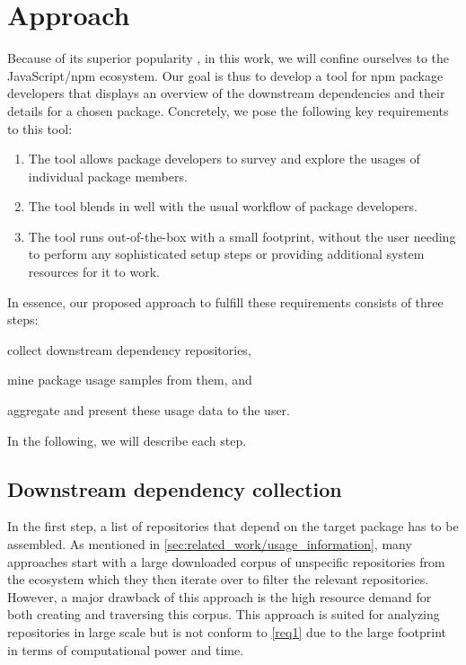 \section{Approach}
\label{sec:approach}

Because of its superior popularity , in this work, we will confine ourselves to the JavaScript/npm ecosystem.
Our goal is thus to develop a tool for npm package developers that displays an overview of the downstream dependencies and their details for a chosen package.
Concretely, we pose the following key requirements to this tool:

\begin{enumerate}[label=R\arabic*]
	\item \label{req1} The tool allows package developers to survey and explore the usages of individual package members.
	\item The tool blends in well with the usual workflow of package developers.
	\item \label{req3} The tool runs out-of-the-box with a small footprint, without the user needing to perform any sophisticated setup steps or providing additional system resources for it to work.
\end{enumerate}

In essence, our proposed approach to fulfill these requirements consists of three steps:
\begin{enumerate*}
	\item collect downstream dependency repositories,
	\item mine package usage samples from them,
	and \item aggregate and present these usage data to the user.
\end{enumerate*}
In the following, we will describe each step.

\subsection{Downstream dependency collection}
\label{sec:approach/collection}

In the first step, a list of repositories that depend on the target package has to be assembled.
As mentioned in \cref{sec:related_work/usage_information}, many approaches start with a large downloaded corpus of unspecific repositories from the ecosystem which they then iterate over to filter the relevant repositories.
However, a major drawback of this approach is the high resource demand for both creating and traversing this corpus.
This approach is suited for analyzing repositories in large scale but is not conform to \cref{req1} due to the large footprint in terms of computational power and time.

